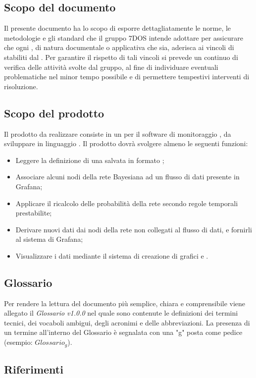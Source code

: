 \subsection{Scopo del documento}
Il presente documento ha lo scopo di esporre dettagliatamente le norme, le metodologie e gli standard che il gruppo 7DOS intende adottare per assicurare che ogni , di natura documentale o applicativa che sia, aderisca ai vincoli di  stabiliti dal . Per garantire il rispetto di tali vincoli si prevede un continuo  di verifica delle attività svolte dal gruppo, al fine di individuare eventuali problematiche nel minor tempo possibile e di permettere tempestivi interventi di risoluzione.
\subsection{Scopo del prodotto}
Il prodotto da realizzare consiste in un  per il software di monitoraggio , da sviluppare in linguaggio . Il prodotto dovrà svolgere almeno le seguenti funzioni:
\begin{itemize}
	\item{Leggere la definizione di una  salvata in formato ;}
	\item{Associare alcuni nodi della rete Bayesiana ad un flusso di dati presente in Grafana;}
	\item{Applicare il ricalcolo delle probabilità della rete secondo regole temporali prestabilite;}
	\item{Derivare nuovi dati dai nodi della rete non collegati al flusso di dati, e fornirli al sistema di Grafana;}
	\item{Visualizzare i dati mediante il sistema di creazione di grafici e .}

\end{itemize}
	
\subsection{Glossario}
Per rendere la lettura del documento più semplice, chiara e comprensibile viene allegato il \emph{Glossario v1.0.0} nel quale sono contenute le definizioni dei termini tecnici, dei vocaboli ambigui, degli acronimi e delle abbreviazioni. La presenza di un termine all'interno del Glossario è segnalata con una "g" posta come pedice (esempio: $Glossario_{g}$).  
\subsection{Riferimenti}

